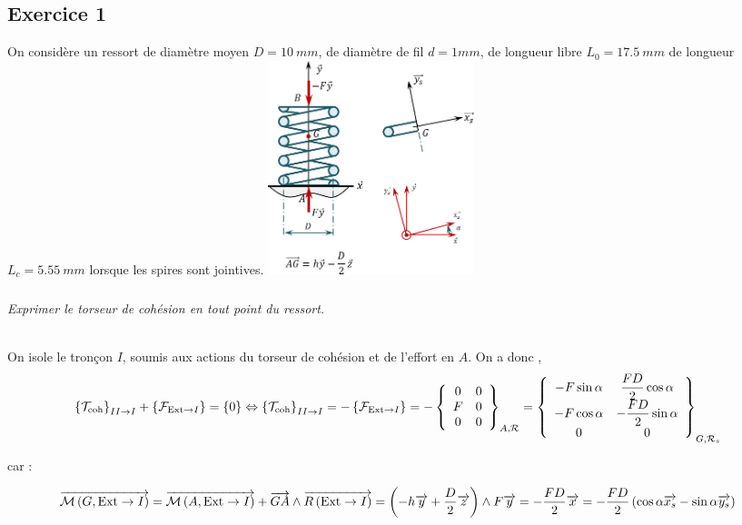 \documentclass[10pt,fleqn]{article} %
\begin{document}

\vspace{8cm}
\pagestyle{fancy}
\thispagestyle{plain}


\def\columnseprulecolor{\color{ocre}}
\setlength{\columnseprule}{0.4pt} 
\ifprof
\else
\begin{multicols}{2}
\fi

\section*{Exercice 1}
\setcounter{subparagraph}{0}
On considère un ressort de diamètre moyen  $D=\SI{10}{mm}$, de diamètre de fil $d=\si{1}{mm}$, de longueur libre $L_0 = \SI{17,5}{mm}$ de longueur $L_c =\SI{5,55}{mm}$ lorsque les spires sont jointives.  
\includegraphics[width=6cm]{images/ressort_01}

\subparagraph{}\textit{Exprimer le torseur de cohésion en tout point du ressort.}

\ifprof
\begin{corrige}~\\

On isole le tronçon $I$, soumis aux actions du torseur de cohésion et de l'effort en $A$. 
On a donc , 
$$
\torseurscoh_{II \rightarrow I} 
+\left\{\mathcal{F}_{\text{Ext}\rightarrow I}\right\}   = \{0\} 
\Leftrightarrow 
\torseurscoh_{II \rightarrow I} 
= - \left\{\mathcal{F}_{\text{Ext}\rightarrow I}\right\} 
= - \torseurcol{0}{F}{0}{0}{0}{0}{A,\mathcal{R}}
= \torseurcol{ -F \sin \alpha }{-F \cos \alpha }{0}{\dfrac{FD}{2}\cos\alpha}{-\dfrac{FD}{2}\sin\alpha}{0}{G,\mathcal{R}_s}
$$

car :

$$
\vectm{G}{\text{Ext}}{I} 
= \vectm{A}{\text{Ext}}{I} +\vect{GA} \wedge \vectf{\text{Ext}}{I}
= \left(-h \vect{y} +\dfrac{D}{2}\vect{z} \right) \wedge F \vect{y}
= -\dfrac{FD}{2}\vect{x}
= -\dfrac{FD}{2}\left(\cos\alpha \vect{x_s} - \sin\alpha \vect{y_s} \right)
$$


\end{corrige}
\end{multicols}
\end{document}
